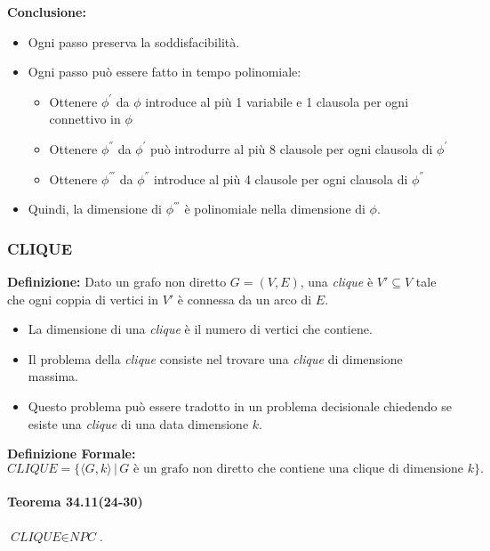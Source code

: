 \documentclass{article}
\begin{document}
\textbf{Conclusione:}
\begin{itemize}
    \item Ogni passo preserva la soddisfacibilità.
    \item Ogni passo può essere fatto in tempo polinomiale:
    \begin{itemize}
        \item Ottenere $\phi^{'}$ da $\phi$ introduce al più 1 variabile e 1 clausola per ogni connettivo in $\phi$
        \item Ottenere $\phi^{''}$ da $\phi^{'}$ può introdurre al più 8 clausole per ogni clausola di $\phi^{'}$
        \item Ottenere $\phi^{'''}$ da $\phi^{''}$ introduce al più 4 clausole per ogni clausola di $\phi^{''}$
    \end{itemize}
    \item Quindi, la dimensione di $\phi^{'''}$ è polinomiale nella dimensione di $\phi$.
\end{itemize}

\subsubsection{CLIQUE}
\textbf{Definizione:} Dato un grafo non diretto $G = (V, E)$, una \textit{clique} è $V' \subseteq V$ tale che ogni coppia di vertici in $V'$ è connessa da un arco di $E$.

\begin{itemize}
    \item La dimensione di una \textit{clique} è il numero di vertici che contiene.
    \item Il problema della \textit{clique} consiste nel trovare una \textit{clique} di dimensione massima.
    \item Questo problema può essere tradotto in un problema decisionale chiedendo se esiste una \textit{clique} di una data dimensione $k$.
\end{itemize}

\textbf{Definizione Formale:}
\[
\textit{CLIQUE} = \{\langle G, k \rangle \,|\, G \text{ è un grafo non diretto che contiene una clique di dimensione } k \}.
\]

\paragraph{Teorema 34.11(24-30)}
\label{teorema-34.11}
\vspace{1em}
\text{}
\newline
$\textit{CLIQUE} \in \textit{NPC}$.
\end{document}
